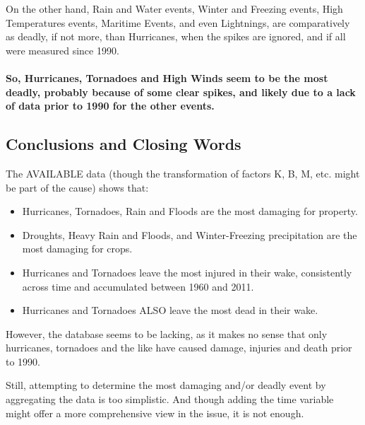 \documentclass[
]{article}
\begin{document}
On the other hand, Rain and Water events, Winter and Freezing events,
High Temperatures events, Maritime Events, and even Lightnings, are
comparatively as deadly, if not more, than Hurricanes, when the spikes
are ignored, and if all were measured since 1990.

\hypertarget{so-hurricanes-tornadoes-and-high-winds-seem-to-be-the-most-deadly-probably-because-of-some-clear-spikes-and-likely-due-to-a-lack-of-data-prior-to-1990-for-the-other-events.}{%
\paragraph{So, Hurricanes, Tornadoes and High Winds seem to be the most
deadly, probably because of some clear spikes, and likely due to a lack
of data prior to 1990 for the other
events.}\label{so-hurricanes-tornadoes-and-high-winds-seem-to-be-the-most-deadly-probably-because-of-some-clear-spikes-and-likely-due-to-a-lack-of-data-prior-to-1990-for-the-other-events.}}

\hypertarget{conclusions-and-closing-words}{%
\subsection{Conclusions and Closing
Words}\label{conclusions-and-closing-words}}

The AVAILABLE data (though the transformation of factors K, B, M, etc.
might be part of the cause) shows that:

\begin{itemize}
\item
  Hurricanes, Tornadoes, Rain and Floods are the most damaging for
  property.
\item
  Droughts, Heavy Rain and Floods, and Winter-Freezing precipitation are
  the most damaging for crops.
\item
  Hurricanes and Tornadoes leave the most injured in their wake,
  consistently across time and accumulated between 1960 and 2011.
\item
  Hurricanes and Tornadoes ALSO leave the most dead in their wake.
\end{itemize}

However, the database seems to be lacking, as it makes no sense that
only hurricanes, tornadoes and the like have caused damage, injuries and
death prior to 1990.

Still, attempting to determine the most damaging and/or deadly event by
aggregating the data is too simplistic. And though adding the time
variable might offer a more comprehensive view in the issue, it is not
enough.
\end{document}
